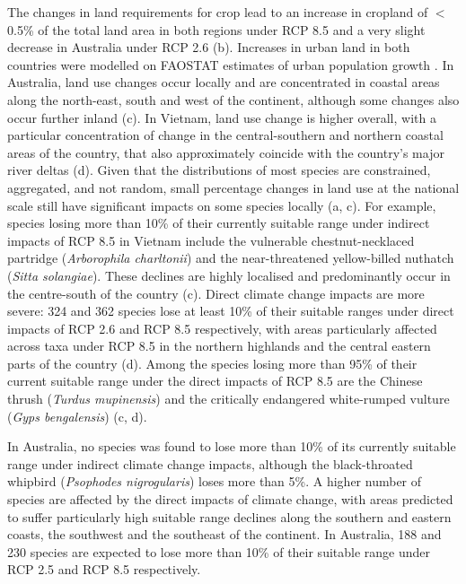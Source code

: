 \documentclass[titlesmallcaps,copyrightpage]{uomthesis}\usepackage[]{graphicx}\usepackage[]{color}
\begin{document}
The changes in land requirements for crop lead to an increase in cropland of $<$ 0.5\% of the total land area in both regions under RCP 8.5 and a very slight decrease in Australia under RCP 2.6 (b). Increases in urban land in both countries were modelled on FAOSTAT estimates of urban population growth \citep{fao_faostat_2017}. In Australia, land use changes occur locally and are concentrated in coastal areas along the north-east, south and west of the continent, although some changes also occur further inland (c). In Vietnam, land use change is higher overall, with a particular concentration of change in the central-southern and northern coastal areas of the country, that also approximately coincide with the country’s major river deltas (d). Given that the distributions of most species are constrained, aggregated, and not random, small percentage changes in land use at the national scale still have significant impacts on some species locally (a, c). For example, species losing more than 10\% of their currently suitable range under indirect impacts of RCP 8.5 in Vietnam include the vulnerable chestnut-necklaced partridge (\textit{Arborophila charltonii}) and the near-threatened yellow-billed nuthatch (\textit{Sitta solangiae}). These declines are highly localised and predominantly occur in the centre-south of the country (c). Direct climate change impacts are more severe: 324 and 362 species lose at least 10\% of their suitable ranges under direct impacts of RCP 2.6 and RCP 8.5 respectively, with areas particularly affected across taxa under RCP 8.5 in the northern highlands and the central eastern parts of the country (d). Among the species losing more than 95\% of their current suitable range under the direct impacts of RCP 8.5 are the Chinese thrush (\textit{Turdus mupinensis}) and the critically endangered white-rumped vulture (\textit{Gyps bengalensis}) (c, d).

In Australia, no species was found to lose more than 10\% of its currently suitable range under indirect climate change impacts, although the black-throated whipbird (\textit{Psophodes nigrogularis}) loses more than 5\%. A higher number of species are affected by the direct impacts of climate change, with areas predicted to suffer particularly high suitable range declines along the southern and eastern coasts, the southwest and the southeast of the continent. In Australia, 188 and 230 species are expected to lose more than 10\% of their suitable range under RCP 2.5 and RCP 8.5 respectively.
\end{document}
